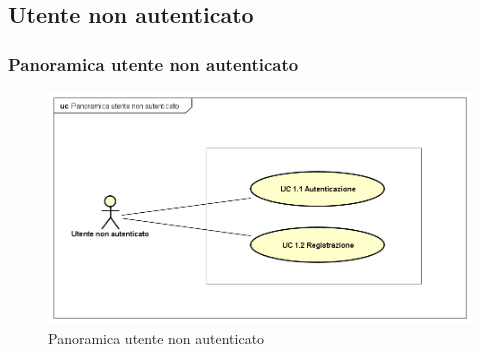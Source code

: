 \subsection{Utente non autenticato}
\subsubsection{Panoramica utente non autenticato}
\begin{figure}[H]
\centering
\includegraphics[width=17cm]{img/UC1.png} 
\caption{Panoramica utente non autenticato}\label{fig:1}
\end{figure}


